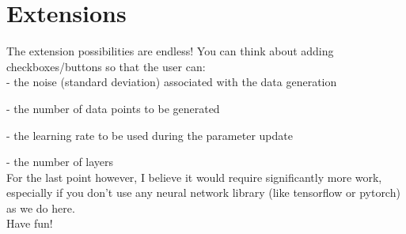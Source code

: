 \section{Extensions}

The extension possibilities are endless! You can think about adding checkboxes/buttons so that the user can: \\

- the noise (standard deviation) associated with the data generation

- the number of data points to be generated

- the learning rate to be used during the parameter update

- the number of layers \\

For the last point however, I believe it would require significantly more work, especially if you don't use any neural network library (like tensorflow or pytorch) as we do here. \\

Have fun!
